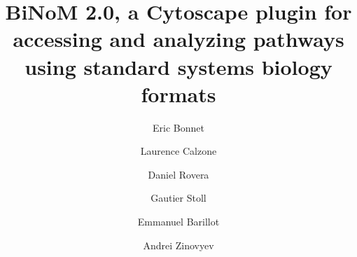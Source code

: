 \documentclass[11pt]{bmc_article_s50}
\newenvironment{bmcformat}{\begin{raggedright}\baselineskip20pt\sloppy\setboolean{publ}{false}}{\end{raggedright}\baselineskip20pt\sloppy}
\begin{document}
\begin{bmcformat}
\justifying
\singlespace

\title{BiNoM 2.0, a Cytoscape plugin for accessing and analyzing pathways using
standard systems biology formats}
\maketitle


%

\author[1,2,3]{Eric Bonnet}
\author[1,2,3]{Laurence Calzone}
\author[1,2,3]{Daniel Rovera}
\author[1,2,3]{Gautier Stoll}
\author[1,2,3]{Emmanuel Barillot}
\author[1,2,3*]{Andrei Zinovyev}\cor{}


\address[1]{Institut Curie, 26 rue d'Ulm, Paris, F-75248 France}
\address[2]{INSERM, U900, Paris, F-75248 France}
\address[3]{Mines ParisTech, Fontainebleau, F-77300 France}



\end{bmcformat}
\end{document}
